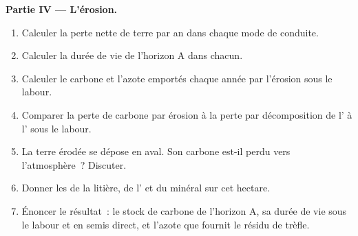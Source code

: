 \begin{problem}
\medskip
\noindent\textbf{Partie IV --- L'érosion.}
\begin{enumerate}[resume]
  \item Calculer la perte nette de terre par an dans chaque mode de
        conduite.
  \item Calculer la durée de vie de l'horizon A dans chacun.
  \item Calculer le carbone et l'azote emportés chaque année par
        l'érosion sous le labour.
  \item Comparer la perte de carbone par érosion à la perte par
        décomposition de l' à l' sous le labour.
  \item La terre érodée se dépose en aval. Son carbone est-il perdu vers
        l'atmosphère~? Discuter.
  \item Donner les  de la litière, de l' et du 
        minéral sur cet hectare.
  \item Énoncer le résultat~: le stock de carbone de l'horizon A, sa
        durée de vie sous le labour et en semis direct, et l'azote que
        fournit le résidu de trèfle.
\end{enumerate}
\end{problem}
